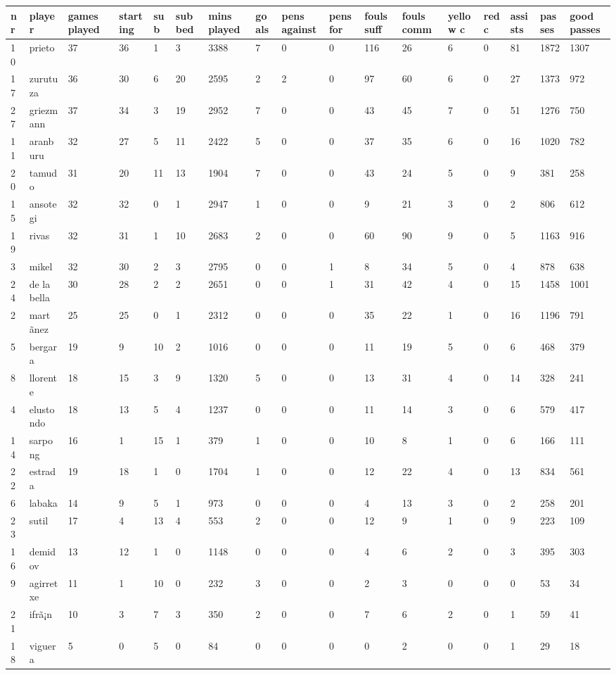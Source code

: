 \documentclass{article}
\begin{document}
\begin{tabular}{lllllllllllllllll}
\toprule
nr & player & games played & starting & sub & subbed & mins played & goals & pens against & pens for & fouls suff & fouls comm & yellow c & red c & assists & passes & good passes \\
\midrule
10 & prieto & 37 & 36 & 1 & 3 & 3388 & 7 & 0 & 0 & 116 & 26 & 6 & 0 & 81 & 1872 & 1307 \\
17 & zurutuza & 36 & 30 & 6 & 20 & 2595 & 2 & 2 & 0 & 97 & 60 & 6 & 0 & 27 & 1373 & 972 \\
27 & griezmann & 37 & 34 & 3 & 19 & 2952 & 7 & 0 & 0 & 43 & 45 & 7 & 0 & 51 & 1276 & 750 \\
11 & aranburu & 32 & 27 & 5 & 11 & 2422 & 5 & 0 & 0 & 37 & 35 & 6 & 0 & 16 & 1020 & 782 \\
20 & tamudo & 31 & 20 & 11 & 13 & 1904 & 7 & 0 & 0 & 43 & 24 & 5 & 0 & 9 & 381 & 258 \\
15 & ansotegi & 32 & 32 & 0 & 1 & 2947 & 1 & 0 & 0 & 9 & 21 & 3 & 0 & 2 & 806 & 612 \\
19 & rivas & 32 & 31 & 1 & 10 & 2683 & 2 & 0 & 0 & 60 & 90 & 9 & 0 & 5 & 1163 & 916 \\
3 & mikel & 32 & 30 & 2 & 3 & 2795 & 0 & 0 & 1 & 8 & 34 & 5 & 0 & 4 & 878 & 638 \\
24 & de la bella & 30 & 28 & 2 & 2 & 2651 & 0 & 0 & 1 & 31 & 42 & 4 & 0 & 15 & 1458 & 1001 \\
2 & martã­nez & 25 & 25 & 0 & 1 & 2312 & 0 & 0 & 0 & 35 & 22 & 1 & 0 & 16 & 1196 & 791 \\
5 & bergara & 19 & 9 & 10 & 2 & 1016 & 0 & 0 & 0 & 11 & 19 & 5 & 0 & 6 & 468 & 379 \\
8 & llorente & 18 & 15 & 3 & 9 & 1320 & 5 & 0 & 0 & 13 & 31 & 4 & 0 & 14 & 328 & 241 \\
4 & elustondo & 18 & 13 & 5 & 4 & 1237 & 0 & 0 & 0 & 11 & 14 & 3 & 0 & 6 & 579 & 417 \\
14 & sarpong & 16 & 1 & 15 & 1 & 379 & 1 & 0 & 0 & 10 & 8 & 1 & 0 & 6 & 166 & 111 \\
22 & estrada & 19 & 18 & 1 & 0 & 1704 & 1 & 0 & 0 & 12 & 22 & 4 & 0 & 13 & 834 & 561 \\
6 & labaka & 14 & 9 & 5 & 1 & 973 & 0 & 0 & 0 & 4 & 13 & 3 & 0 & 2 & 258 & 201 \\
23 & sutil & 17 & 4 & 13 & 4 & 553 & 2 & 0 & 0 & 12 & 9 & 1 & 0 & 9 & 223 & 109 \\
16 & demidov & 13 & 12 & 1 & 0 & 1148 & 0 & 0 & 0 & 4 & 6 & 2 & 0 & 3 & 395 & 303 \\
9 & agirretxe & 11 & 1 & 10 & 0 & 232 & 3 & 0 & 0 & 2 & 3 & 0 & 0 & 0 & 53 & 34 \\
21 & ifrã¡n & 10 & 3 & 7 & 3 & 350 & 2 & 0 & 0 & 7 & 6 & 2 & 0 & 1 & 59 & 41 \\
18 & viguera & 5 & 0 & 5 & 0 & 84 & 0 & 0 & 0 & 0 & 2 & 0 & 0 & 1 & 29 & 18 \\
\bottomrule
\end{tabular}
\end{document}
